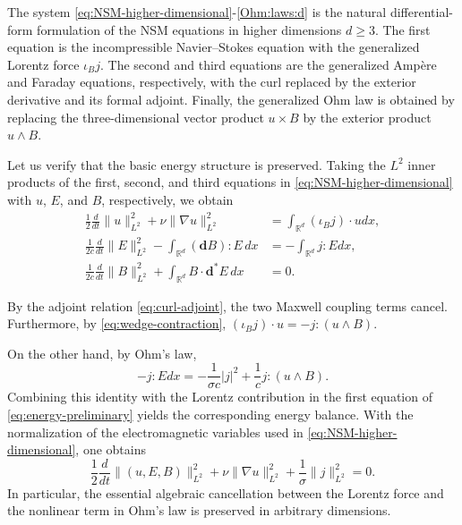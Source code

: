 \documentclass[11pt, leqno, a4paper,]{amsart}
\theoremstyle{remark}
\numberwithin{equation}{section}
\begin{document}
 The system \eqref{eq:NSM-higher-dimensional}-\eqref{Ohm:laws:d} is the natural differential-form formulation of the NSM equations in higher dimensions $d\geq3$. The first equation is the incompressible Navier--Stokes equation with the generalized Lorentz force $\iota_Bj$. The second and third equations are the generalized Amp\`ere and Faraday equations, respectively, with the curl replaced by the exterior derivative and its formal adjoint. Finally, the generalized Ohm law is obtained by replacing the three-dimensional vector product $u\times B$ by the exterior product $u\wedge B$.
 
 
 
  Let us verify that the basic energy structure is preserved. Taking the \(L^2\) inner products of the first, second, and third equations in \eqref{eq:NSM-higher-dimensional} with $u$, $E$, and $B $, respectively, we obtain 
 \begin{equation}\label{eq:energy-preliminary} \begin{aligned} \frac12\frac{d}{dt}\|u\|_{L^2}^2 +\nu\|\nabla u\|_{L^2}^2 &= \int_{\mathbb R^d} (\iota_Bj)\cdot u dx, 
 \\ \frac1{2c}\frac{d}{dt}\|E\|_{L^2}^2 - \int_{\mathbb R^d} (\mathbf d B):E\,dx &= -\int_{\mathbb R^d}j:E dx, 
 \\ \frac1{2c}\frac{d}{dt}\|B\|_{L^2}^2 + \int_{\mathbb R^d} B\cdot\mathbf d^*E\,dx &= 0. \end{aligned} \end{equation}
 
  By the adjoint relation \eqref{eq:curl-adjoint}, the two Maxwell coupling terms cancel. Furthermore, by \eqref{eq:wedge-contraction}, $ (\iota_Bj)\cdot u = - j:(u\wedge B)$.
  
  On the other hand, by Ohm's law, 
  \begin{equation*}
-j:E dx= - \frac{1}{\sigma c} |j|^2 + \frac{1}{c } j : (u \wedge B).
  \end{equation*}
Combining this identity with the Lorentz contribution in the first equation of \eqref{eq:energy-preliminary} yields the corresponding energy balance. With the normalization of the electromagnetic variables used in \eqref{eq:NSM-higher-dimensional}, one obtains
\begin{equation}\label{eq:higher-dimensional-energy}
\frac12\frac{d}{dt} 
\|(u,E,B)\|_{L^2}^2    +
\nu\|\nabla u\|_{L^2}^2 +
\frac1{\sigma }\|j\|_{L^2}^2= 0.
\end{equation}
 In particular, the essential algebraic cancellation between the Lorentz force and the nonlinear term in Ohm's law is preserved in arbitrary dimensions.
\end{document}

